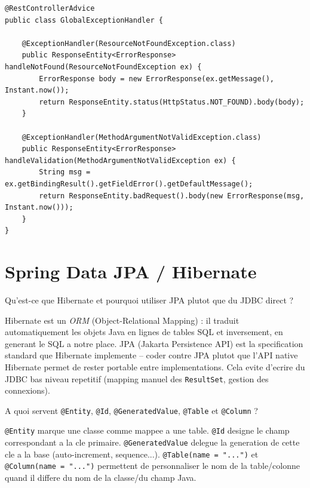 \documentclass[11pt,a4paper]{article}
\begin{document}
\begin{lstlisting}
@RestControllerAdvice
public class GlobalExceptionHandler {

    @ExceptionHandler(ResourceNotFoundException.class)
    public ResponseEntity<ErrorResponse> handleNotFound(ResourceNotFoundException ex) {
        ErrorResponse body = new ErrorResponse(ex.getMessage(), Instant.now());
        return ResponseEntity.status(HttpStatus.NOT_FOUND).body(body);
    }

    @ExceptionHandler(MethodArgumentNotValidException.class)
    public ResponseEntity<ErrorResponse> handleValidation(MethodArgumentNotValidException ex) {
        String msg = ex.getBindingResult().getFieldError().getDefaultMessage();
        return ResponseEntity.badRequest().body(new ErrorResponse(msg, Instant.now()));
    }
}
\end{lstlisting}

\newpage
\section{Spring Data JPA / Hibernate}

\begin{question} Qu'est-ce que Hibernate et pourquoi utiliser JPA plutot que du JDBC direct ?
\end{question}
\begin{reponse}
Hibernate est un \emph{ORM} (Object-Relational Mapping) : il traduit automatiquement les objets Java en lignes de tables SQL et inversement, en generant le SQL a notre place. JPA (Jakarta Persistence API) est la specification standard que Hibernate implemente -- coder contre JPA plutot que l'API native Hibernate permet de rester portable entre implementations. Cela evite d'ecrire du JDBC bas niveau repetitif (mapping manuel des \texttt{ResultSet}, gestion des connexions).
\end{reponse}

\begin{question} A quoi servent \texttt{@Entity}, \texttt{@Id}, \texttt{@GeneratedValue}, \texttt{@Table} et \texttt{@Column} ?
\end{question}
\begin{reponse}
\texttt{@Entity} marque une classe comme mappee a une table. \texttt{@Id} designe le champ correspondant a la cle primaire. \texttt{@GeneratedValue} delegue la generation de cette cle a la base (auto-increment, sequence...). \texttt{@Table(name = "...")} et \texttt{@Column(name = "...")} permettent de personnaliser le nom de la table/colonne quand il differe du nom de la classe/du champ Java.
\end{reponse}
\end{document}
